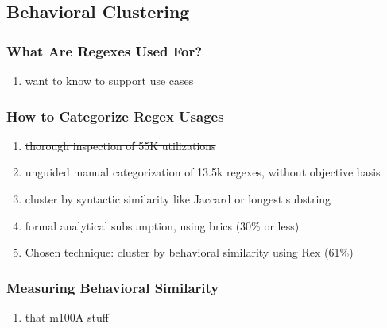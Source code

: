 \subsection{Behavioral Clustering}

\begin{frame}
\frametitle{What Are Regexes Used For?}
\begin{enumerate}
\item want to know to support use cases
\end{enumerate}
\end{frame}




\begin{frame}
\frametitle{How to Categorize Regex Usages}
\begin{enumerate}
\item \sout{thorough inspection of 55K utilizations}
\item \sout{unguided manual categorization of 13.5k regexes, without objective basis}
\item \sout{cluster by syntactic similarity like Jaccard or longest substring}
\item \sout{formal analytical subsumption, using brics (30\% or less)}
\item Chosen technique: cluster by behavioral similarity using Rex (61\%)
\end{enumerate}
\end{frame}


\begin{frame}
\frametitle{Measuring Behavioral Similarity}
\begin{enumerate}
\item that  m100A stuff
\end{enumerate}
\end{frame}

